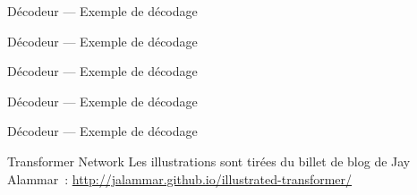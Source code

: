\begin{frame}{Décodeur --- Exemple de décodage}
\end{frame}

\begin{frame}{Décodeur --- Exemple de décodage}
\end{frame}

\begin{frame}{Décodeur --- Exemple de décodage}
\end{frame}

\begin{frame}{Décodeur --- Exemple de décodage}
\end{frame}

\begin{frame}{Décodeur --- Exemple de décodage}
\end{frame}

\begin{frame}{Transformer Network}
  Les illustrations sont tirées du billet de blog de Jay Alammar~:
  \url{http://jalammar.github.io/illustrated-transformer/}
\end{frame}
